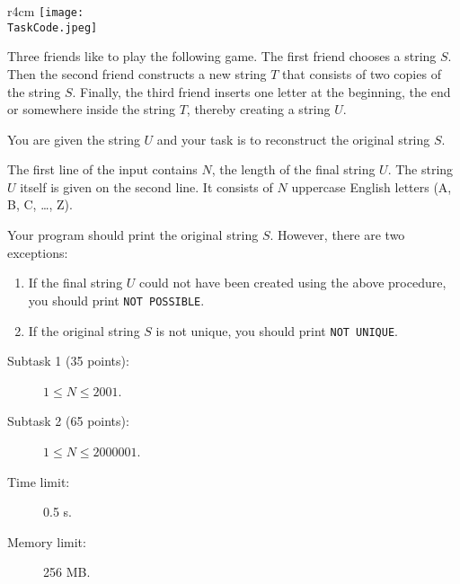 \documentclass{boi2014}
\renewcommand{\TaskCode}{friends}
\begin{document}
    \begin{wrapfigure}{r}{4cm}
        \vspace{-24pt}
		\texttt{[image: \\TaskCode.jpeg]}
	\end{wrapfigure}
    Three friends like to play the following game.
    The first friend chooses a string $S$.
    Then the second friend constructs a new string $T$ that consists of
    two copies of the string $S$. 
    Finally, the third friend inserts one letter at the beginning, the end or somewhere
    inside the string $T$, thereby creating a string $U$.

    \Task
    You are given the string $U$ and your task is to reconstruct the original string $S$.

    \Input
    The first line of the input contains $N$, the length of the final string $U$.
    The string $U$ itself is given on the second line. It consists of $N$
    uppercase English letters (A, B, C, \ldots{}, Z).

    \Output
    Your program should print the original string $S$.
    However, there are two exceptions:
    \begin{enumerate}
        \item If the final string $U$ could not have been created using the above
        procedure, you should print {\tt NOT POSSIBLE}.
        \item If the original string $S$ is not unique, you should print {\tt NOT
        UNIQUE}.
    \end{enumerate}

    \Examples


    \Scoring

    \begin{description}
        \item[Subtask 1 (35 points):] $1 \le N \le 2001$.
        \item[Subtask 2 (65 points):] $1 \le N \le 2000001$.
    \end{description}

    \Constraints

    \begin{description}
        \item[Time limit:] 0.5 s.
        \item[Memory limit:] 256 MB.
    \end{description}
\end{document}
